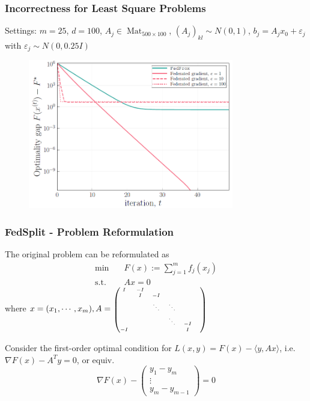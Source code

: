 \begin{frame}
\frametitle{Incorrectness for Least Square Problems}

Settings: $m=25$, $d=100$, $A_j \in \operatorname{Mat}_{500\times 100}$, $(A_j)_{kl} \sim N(0,1)$, $b_j = A_jx_0 + \varepsilon_j$ with $\varepsilon_j \sim N(0,0.25I)$

\begin{figure}
\centering
\includegraphics[width=0.8\textwidth]{images/fedsplit-gap.png}
\end{figure}

\end{frame}


\begin{frame}
\frametitle{FedSplit - Problem Reformulation}

The original problem can be reformulated as
\begin{align*}
    \text{min} & \quad F(x) := \sum_{j=1}^m f_j(x_j) \\
    \text{s.t.} & \quad Ax = 0
\end{align*}
where $x = (x_1, \cdots, x_m), A = \text{{\smaller[3]$\begin{pmatrix} I & -I & & & & \\ & I & -I & & \\ & & \ddots & \ddots & \\ & & & \ddots & -I \\ -I & & & & I \end{pmatrix}$}}$

Consider the first-order optimal condition for $L(x,y) = F(x) - \langle y, Ax \rangle$, i.e. $\nabla F(x) - A^Ty = 0$, or equiv.
$$\nabla F(x) - \begin{pmatrix} y_1-y_m \\ \vdots \\ y_m-y_{m-1} \end{pmatrix} = 0$$

\end{frame}

